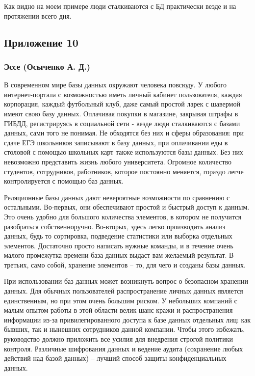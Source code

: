 \documentclass[a4paper,14pt]{extarticle}
\begin{document}
Как видно на моем примере люди сталкиваются с БД практически везде и на протяжении всего дня.

\newpage

\subsection*{\hfill Приложение 10}

\subsubsection*{\centering Эссе (Осыченко А. Д.)}

В современном мире базы данных окружают человека повсюду. У любого интернет-портала с возможностью иметь личный кабинет пользователя, каждая корпорация, каждый футбольный клуб, даже самый простой ларек с шавермой имеют свою базу данных. Оплачивая покупки в магазине, закрывая штрафы в ГИБДД, регистрируясь в социальной сети - везде люди сталкиваются с базами данных, сами того не понимая. Не обходятся без них и сферы образования: при сдаче ЕГЭ школьников записывают в базу данных, при оплачивании еды в столовой с помощью школьных карт также используются базы данных. Без них невозможно представить жизнь любого университета. Огромное количество студентов, сотрудников, работников, которое постоянно меняется, гораздо легче контролируется с помощью баз данных.

Реляционные базы данных дают невероятные возможности по сравнению с остальными. Во-первых, они обеспечивают простой и быстрый доступ к данным. Это очень удобно для большого количества элементов, в котором не получится разобраться собственноручно. Во-вторых, здесь легко производить анализ данных, будь то сортировка, подведение статистики или выборка отдельных элементов. Достаточно просто написать нужные команды, и в течение очень малого промежутка времени база данных выдаст вам желаемый результат. В-третьих, само собой, хранение элементов – то, для чего и созданы базы данных.

При использовании баз данных может возникнуть вопрос о безопасном хранении данных. Для обычных пользователей распространение личных данных является единственным, но при этом очень большим риском. У небольших компаний с малым опытом работы в этой области велик шанс кражи и распространения информации из-за привилегированного доступа к базе данных отдельных лиц: как бывших, так и нынешних сотрудников данной компании. Чтобы этого избежать, руководство должно приложить все усилия для внедрения строгой политики контроля. Различные шифрования данных и ведение аудита (сохранение любых действий над базой данных) – лучший способ защиты конфиденциальных данных.
\end{document}
